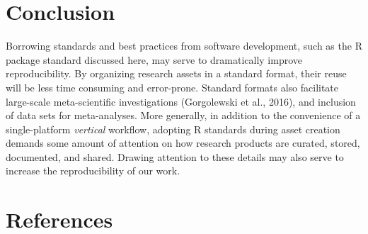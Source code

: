 \documentclass[
  english,
  jou,floatsintext]{apa6}
\begin{document}
\hypertarget{conclusion}{%
\section{Conclusion}\label{conclusion}}

Borrowing standards and best practices from software development, such as the R package standard discussed here, may serve to dramatically improve reproducibility. By organizing research assets in a standard format, their reuse will be less time consuming and error-prone. Standard formats also facilitate large-scale meta-scientific investigations (Gorgolewski et al., 2016), and inclusion of data sets for meta-analyses. More generally, in addition to the convenience of a single-platform \emph{vertical} workflow, adopting R standards during asset creation demands some amount of attention on how research products are curated, stored, documented, and shared. Drawing attention to these details may also serve to increase the reproducibility of our work.

\hypertarget{references}{%
\section{References}\label{references}}

\begingroup
\end{document}
